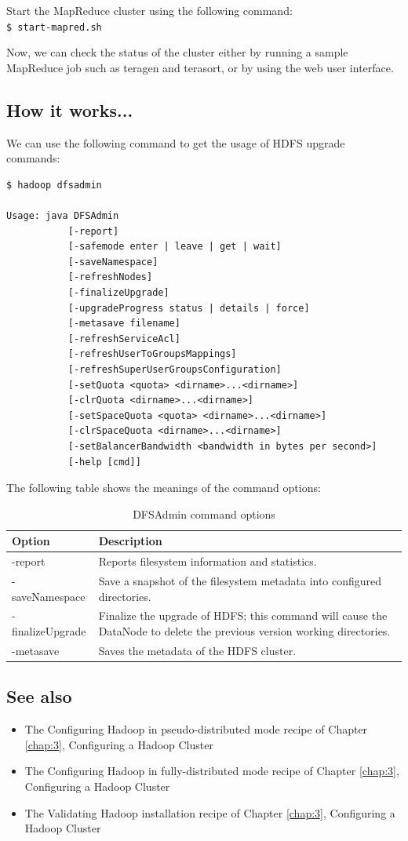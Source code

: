 Start the MapReduce cluster using the following command: \\ 
\verb|$ start-mapred.sh| 

Now, we can check the status of the cluster either by running a sample MapReduce job such as teragen and terasort, or by using the web user interface.

\subsection*{How it works...}
We can use the following command to get the usage of HDFS upgrade commands:
\lstset{style=bashstyle}
\begin{lstlisting}
$ hadoop dfsadmin

Usage: java DFSAdmin
           [-report]
           [-safemode enter | leave | get | wait]
           [-saveNamespace]
           [-refreshNodes]
           [-finalizeUpgrade]
           [-upgradeProgress status | details | force]
           [-metasave filename]
           [-refreshServiceAcl]
           [-refreshUserToGroupsMappings]
           [-refreshSuperUserGroupsConfiguration]
           [-setQuota <quota> <dirname>...<dirname>]
           [-clrQuota <dirname>...<dirname>]
           [-setSpaceQuota <quota> <dirname>...<dirname>]
           [-clrSpaceQuota <dirname>...<dirname>]
           [-setBalancerBandwidth <bandwidth in bytes per second>]
           [-help [cmd]]
\end{lstlisting}

The following table shows the meanings of the command options:
\begin{table}
  \centering
  \small
  \begin{tabular}{lp{}}
    \toprule 
    \textbf{Option} & \textbf{Description} \\ \midrule 
    -report & Reports filesystem information and statistics. \\ 
    -saveNamespace & Save a snapshot of the filesystem metadata into configured directories. \\
    -finalizeUpgrade & Finalize the upgrade of HDFS; this command will cause the DataNode to delete the previous version working directories. \\
    -metasave & Saves the metadata of the HDFS cluster. \\ \bottomrule 
  \end{tabular}
  \caption{DFSAdmin command options}\label{tbl:dfsadmin}
\end{table}

\subsection*{See also}
\begin{itemize}
  \item The Configuring Hadoop in pseudo-distributed mode recipe of Chapter \ref{chap:3}, Configuring a Hadoop Cluster
  \item The Configuring Hadoop in fully-distributed mode recipe of Chapter \ref{chap:3}, Configuring a Hadoop Cluster
  \item The Validating Hadoop installation recipe of Chapter \ref{chap:3}, Configuring a Hadoop Cluster
\end{itemize}
